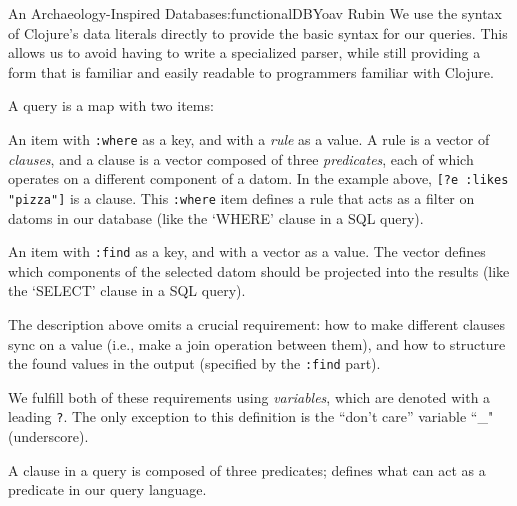 \begin{aosachapter}{An Archaeology-Inspired Database}{s:functionalDB}{Yoav Rubin}
We use the syntax of Clojure's data literals directly to provide the
basic syntax for our queries. This allows us to avoid having to write a
specialized parser, while still providing a form that is familiar and
easily readable to programmers familiar with Clojure.

A query is a map with two items:

\begin{aosaitemize}

\item
  An item with \texttt{:where} as a key, and with a \emph{rule} as a
  value. A rule is a vector of \emph{clauses}, and a clause is a vector
  composed of three \emph{predicates}, each of which operates on a
  different component of a datom. In the example above,
  \texttt{{[}?e  :likes "pizza"{]}} is a clause. This \texttt{:where}
  item defines a rule that acts as a filter on datoms in our database
  (like the `WHERE' clause in a SQL query).
\item
  An item with \texttt{:find} as a key, and with a vector as a value.
  The vector defines which components of the selected datom should be
  projected into the results (like the `SELECT' clause in a SQL query).
\end{aosaitemize}

The description above omits a crucial requirement: how to make different
clauses sync on a value (i.e., make a join operation between them), and
how to structure the found values in the output (specified by the
\texttt{:find} part).

We fulfill both of these requirements using \emph{variables}, which are
denoted with a leading \texttt{?}. The only exception to this definition
is the ``don't care'' variable ``\_" (underscore).

A clause in a query is composed of three predicates;
 defines what can act as a
predicate in our query language.


\end{aosachapter}
